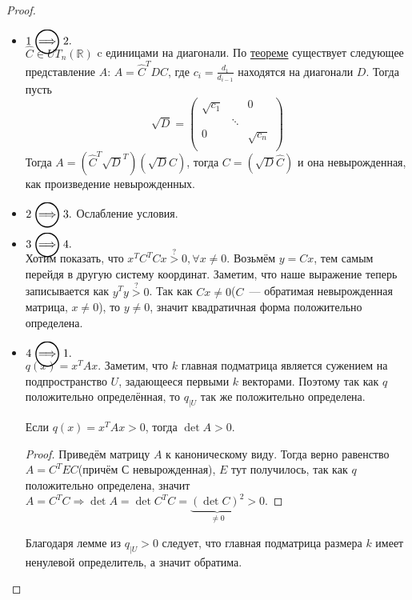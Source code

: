 \begin{proof}\leavevmode
    \begin{itemize}
        \item $1 \ora 2.$\\
            $\hat{C}\in UT_n(\mathbb{R})$ c единицами на диагонали.
            По \hyperref[stm:О приведении квадратичной формы к каноническому виду]{теореме} 
            существует следующее представление $A$: $A = \hat{C}^T D \hat{C}$,
            где $c_i = \frac{d_1}{d_{i - 1}}$ находятся на диагонали $D$.
            Тогда пусть
            \[
                \sqrt{D} = 
                \begin{pmatrix}
                    \sqrt{c_1} & & 0 \\
                    & \ddots &\\
                    0 & & \sqrt{c_n}\\
                \end{pmatrix}
            \]
            Тогда $A = \left(\hat{C}^T\sqrt{D}^T\right)\left(\sqrt{D}\hat{C}\right)$, тогда 
            $C=\left(\sqrt{D}\hat{C}\right)$ и она невырожденная, как произведение 
            невырожденных.
        \item
            $2 \ora 3.$ Ослабление условия.
        \item
            $3 \ora 4.$\\
            Хотим показать, что $x^TC^T Cx \stackrel{?}{>} 0, \forall x\not=0$.
            Возьмём  $y  = Cx$, тем самым перейдя в другую систему координат.
            Заметим, что наше выражение теперь записывается как  $y^Ty \stackrel{?}{>} 0$.
            Так как $Cx \not =0$($C$~--- обратимая невырожденная матрица, $x\neq 0$),
            то $y \not= 0$, значит квадратичная форма положительно определена.
        \item
            $4 \ora 1.$\\
            $q(x) = x^T A x$. Заметим, что $k$ главная подматрица является сужением
            на подпространство $U$, задающееся первыми $k$ векторами. Поэтому так как
            $q$ положительно определённая, то $q_{|U}$ так же положительно определена.
            \\
            \begin{lemma}
                Если $q(x)  = x^T A x > 0$, тогда  $\det A > 0$.
            \end{lemma}
            \begin{proof}
                Приведём матрицу $A$ к каноническому виду. Тогда верно
                равенство $A = C^T E C$(причём $С$ невырожденная), $E$ тут получилось,
                так как $q$ положительно определена, значит $A = C^T C \Rightarrow \det A =
                \det C^T C = \underbrace{(\det C)^2}_{\not= 0} > 0$.
            \end{proof}
            Благодаря лемме из $q_{|U} > 0$ следует, что главная подматрица размера $k$
            имеет ненулевой определитель, а значит обратима.
    \end{itemize}
\end{proof}
